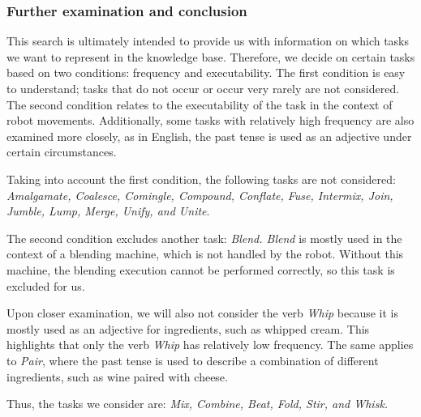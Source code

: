   \subsubsection*{Further examination and conclusion}
  This search is ultimately intended to provide us with information on which tasks we want to represent in the knowledge base. Therefore, we decide on certain tasks based on two conditions: frequency and executability. The first condition is easy to understand; tasks that do not occur or occur very rarely are not considered. The second condition relates to the executability of the task in the context of robot movements. Additionally, some tasks with relatively high frequency are also examined more closely, as in English, the past tense is used as an adjective under certain circumstances.

Taking into account the first condition, the following tasks are not considered: \textit{Amalgamate, Coalesce, Comingle, Compound, Conflate, Fuse, Intermix, Join, Jumble, Lump, Merge, Unify, and Unite}.

The second condition excludes another task: \textit{Blend. Blend} is mostly used in the context of a blending machine, which is not handled by the robot. Without this machine, the blending execution cannot be performed correctly, so this task is excluded for us.

Upon closer examination, we will also not consider the verb \textit{Whip} because it is mostly used as an adjective for ingredients, such as whipped cream. This highlights that only the verb \textit{Whip} has relatively low frequency. The same applies to \textit{Pair}, where the past tense is used to describe a combination of different ingredients, such as wine paired with cheese.

Thus, the tasks we consider are: \textit{Mix, Combine, Beat, Fold, Stir, and Whisk.}

